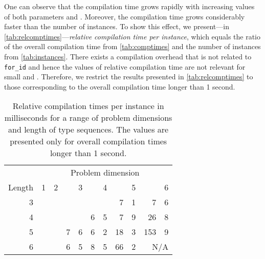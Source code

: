 \documentclass[10pt,a4paper]{article}
\theoremstyle{definition}\newtheorem{problem}{Problem}
\providecommand{\forid}{\texttt{for\_id}\xspace}
\begin{document}
One can observe that the compilation time grows rapidly with increasing values of both parameters  and . Moreover, the compilation time grows considerably faster than the number of instances. To show this effect, we present---in \autoref{tab:relcomptimes}---\emph{relative compilation time per instance}, which equals the ratio of the overall compilation time from \autoref{tab:comptimes} and the number of instances from \autoref{tab:instances}. There exists a compilation overhead that is not related to \forid and hence the values of relative compilation time are not relevant for small  and . Therefore, we restrict the results presented in \autoref{tab:relcomptimes} to those corresponding to the overall compilation time longer than 1 second.
\renewcommand{\arraystretch}{1.00}
\renewcommand{\tabcolsep}{3mm}
\begin{table}[t]
\caption{Relative compilation times per instance in milliseconds for a range of problem dimensions and length of type sequences. The values are presented only for overall compilation times longer than 1 second.}
\begin{center}
\begin{tabular}{r*{6}{r@{.}l}}
\toprule
 & \multicolumn{12}{c}{Problem dimension } \\ \cmidrule(l){2-13}
Length  & \multicolumn{2}{r}{1} & \multicolumn{2}{r}{2} & \multicolumn{2}{r}{3} & \multicolumn{2}{r}{4} & \multicolumn{2}{r}{5} & \multicolumn{2}{r}{6} \\ \cmidrule(r){1-1} \cmidrule(l){2-13}
3 & \multicolumn{2}{c}{} & \multicolumn{2}{c}{} & \multicolumn{2}{c}{} & \multicolumn{2}{c}{} & 7 & 1 & 7 & 6 \\
4 & \multicolumn{2}{c}{} & \multicolumn{2}{c}{} & \multicolumn{2}{c}{} & 6 & 5 & 7  & 9 & 26  & 8 \\
5 & \multicolumn{2}{c}{} & \multicolumn{2}{c}{} & 7 & 6 & 6 & 2 & 18 & 3 & 153 & 9 \\
6 & \multicolumn{2}{c}{} & \multicolumn{2}{c}{} & 6 & 5 & 8 & 5 & 66 & 2 & \multicolumn{2}{r}{N/A} \\
\bottomrule
\end{tabular}
\end{center}
\label{tab:relcomptimes}
\end{table}
\end{document}
